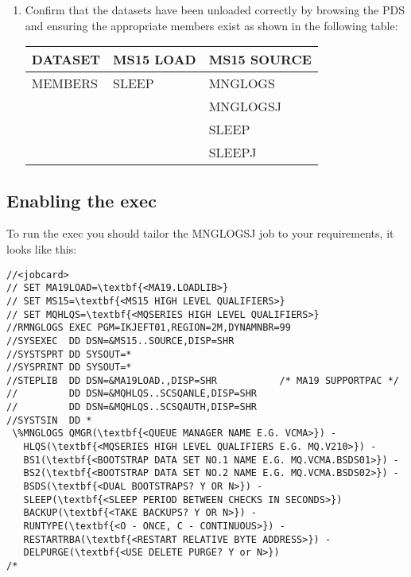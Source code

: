 \documentclass[a4paper,12pt]{report}
\begin{document}
\begin{enumerate}
\item Confirm that the datasets
have been unloaded correctly by browsing the PDS and
ensuring the appropriate members exist as shown in the following table:\\
\begin{tabular}{| l | l | l |}
\hline
\textbf{DATASET} & \textbf{MS15 LOAD} & \textbf{MS15 SOURCE}\\
\hline
MEMBERS & SLEEP & MNGLOGS\\
 & & MNGLOGSJ\\
 & & SLEEP\\
 & & SLEEPJ\\
\hline
\end{tabular}
\end{enumerate}
%
\subsection{Enabling the exec}
%
To run the exec you should tailor the MNGLOGSJ job to your
requirements, it looks like this: 
\begin{Verbatim}[commandchars=\\\{\}]
//<jobcard>
// SET MA19LOAD=\textbf{<MA19.LOADLIB>}
// SET MS15=\textbf{<MS15 HIGH LEVEL QUALIFIERS>}
// SET MQHLQS=\textbf{<MQSERIES HIGH LEVEL QUALIFIERS>}
//RMNGLOGS EXEC PGM=IKJEFT01,REGION=2M,DYNAMNBR=99
//SYSEXEC  DD DSN=&MS15..SOURCE,DISP=SHR
//SYSTSPRT DD SYSOUT=*
//SYSPRINT DD SYSOUT=*
//STEPLIB  DD DSN=&MA19LOAD.,DISP=SHR           /* MA19 SUPPORTPAC */
//         DD DSN=&MQHLQS..SCSQANLE,DISP=SHR
//         DD DSN=&MQHLQS..SCSQAUTH,DISP=SHR
//SYSTSIN  DD *
 \%MNGLOGS QMGR(\textbf{<QUEUE MANAGER NAME E.G. VCMA>}) -
   HLQS(\textbf{<MQSERIES HIGH LEVEL QUALIFIERS E.G. MQ.V210>}) -
   BS1(\textbf{<BOOTSTRAP DATA SET NO.1 NAME E.G. MQ.VCMA.BSDS01>}) -
   BS2(\textbf{<BOOTSTRAP DATA SET NO.2 NAME E.G. MQ.VCMA.BSDS02>}) -
   BSDS(\textbf{<DUAL BOOTSTRAPS? Y OR N>}) -
   SLEEP(\textbf{<SLEEP PERIOD BETWEEN CHECKS IN SECONDS>})
   BACKUP(\textbf{<TAKE BACKUPS? Y OR N>}) -
   RUNTYPE(\textbf{<O - ONCE, C - CONTINUOUS>}) -
   RESTARTRBA(\textbf{<RESTART RELATIVE BYTE ADDRESS>}) -
   DELPURGE(\textbf{<USE DELETE PURGE? Y or N>})
/*
\end{Verbatim}
\end{document}
